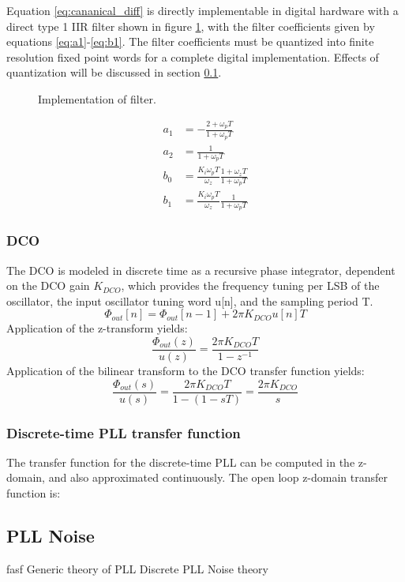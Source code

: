 Equation \ref{eq:cananical_diff} is directly implementable in digital hardware with a direct type 1 IIR filter shown in figure \ref{fig:filt_imple}, with the filter coefficients given by equations \ref{eq:a1}-\ref{eq:b1}. The filter coefficients must be quantized into finite resolution fixed point words for a complete digital implementation. Effects of quantization will be discussed in section \ref{pn_theory}.
\begin{figure}[htb!]
	\center
	\caption{Implementation of filter.}
	\label{fig:filt_imple}
\end{figure}
\begin{align}
	a_1 &= -\frac{2+\omega_pT}{1+\omega_pT}\label{eq:a1}\\
	a_2 &= \frac{1}{1+\omega_pT} \\
	b_0 &= \frac{K_i\omega_pT}{\omega_z}\frac{1+\omega_zT}{1+\omega_pT}\\
	b_1 &= \frac{K_i\omega_pT}{\omega_z}\frac{1}{1+\omega_pT}\label{eq:b1}
\end{align}
\subsubsection{DCO}
The DCO is modeled in discrete time as a recursive phase integrator, dependent on the DCO gain $K_{DCO}$, which provides the frequency tuning per LSB of the oscillator, the input oscillator tuning word u[n], and the sampling period T.
\begin{equation}
	\Phi_{out}[n] = \Phi_{out}[n-1] + 2\pi K_{DCO}u[n]T
\end{equation}
Application of the z-transform yields:
\begin{equation}
	\frac{\Phi_{out}(z)}{u(z)} = \frac{2\pi K_{DCO}T}{1-z^{-1}}
\end{equation}
Application of the bilinear transform to the DCO transfer function yields:
\begin{equation}
	\frac{\Phi_{out}(s)}{u(s)} = \frac{2\pi K_{DCO}T}{1-(1-sT)} = \frac{2\pi K_{DCO}}{s} 
\end{equation}
\subsubsection{Discrete-time PLL transfer function}
The transfer function for the discrete-time PLL can be computed in the z-domain, and also approximated continuously. The open loop z-domain transfer function is:

\subsection{PLL Noise} \label{pn_theory}
fasf
Generic theory of PLL
Discrete PLL
Noise theory
